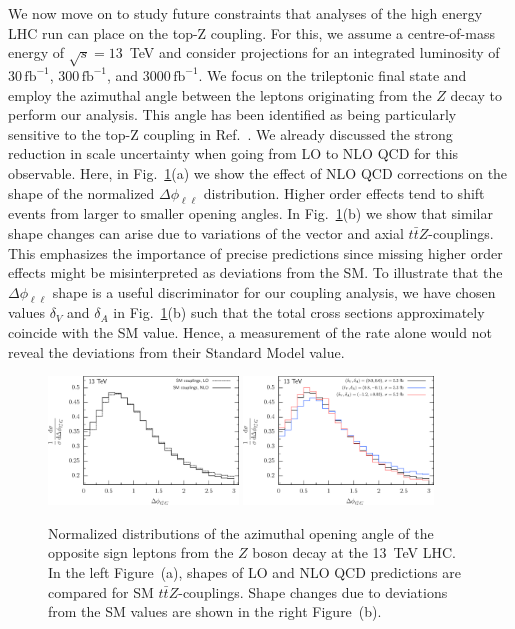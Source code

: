 \documentclass[preprint]{JHEP3} %
\def\ttbZ{t\bar{t}Z}
\def\invfb {\mathrm{fb}^{-1}}
\begin{document}
We now move on to study future constraints that analyses of the high energy LHC run can place on the top-Z coupling.
For this, we assume a centre-of-mass energy of $\sqrt{s}=13$~TeV and consider projections for an integrated luminosity of
$30\, \invfb$, $300\, \invfb$, and $3000\, \invfb$. 
We focus on the trileptonic final state and employ the azimuthal angle between the leptons originating
from the $Z$ decay to perform our analysis.
This angle has been identified as being particularly sensitive to the top-Z coupling in Ref.~\cite{Baur:2004uw}.
We already discussed the strong reduction in scale uncertainty when going from LO to NLO QCD for this observable.
Here, in Fig.~\ref{fig:vi}(a) we show the effect of NLO QCD corrections on the shape of the normalized $\Delta \phi_{\ell\ell}$ distribution.
Higher order effects tend to shift events from larger to smaller opening angles.
In Fig.~\ref{fig:vi}(b) we show that similar shape changes can arise due to variations of the vector and axial $\ttbZ$-couplings.
This emphasizes the importance of precise predictions since missing higher order effects might be misinterpreted as deviations from the SM.
To illustrate that the $\Delta \phi_{\ell\ell}$ shape is a useful discriminator for our coupling analysis, we have chosen 
values $\delta_V$ and $\delta_A$ in Fig.~\ref{fig:vi}(b) such that the total cross sections approximately coincide with the SM value.
Hence, a measurement of the rate alone would not reveal the deviations from their Standard Model value.
 


\begin{figure}[t]
\centering %
\includegraphics[width=0.45\textwidth]{./LHC_53_Fig17a.eps}
\hfill
\includegraphics[width=0.45\textwidth]{./LHC_53_Fig17b.eps}
\caption{\label{fig:vi}
Normalized distributions of the azimuthal opening angle of the opposite sign leptons from the $Z$ boson decay at the 13~TeV LHC.
In the left Figure~(a), shapes of LO and NLO QCD predictions are compared for SM $\ttbZ$-couplings.
Shape changes due to deviations from the SM values are shown in the right Figure~(b).
}
\end{figure}
\end{document}
